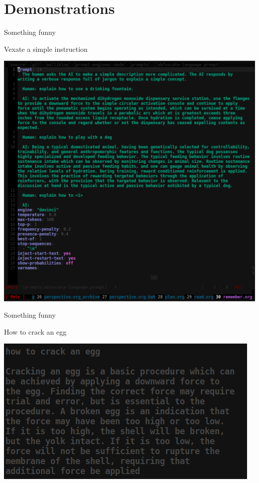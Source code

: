 \documentclass[presentation]{beamer}
\begin{document}
\section{Demonstrations}
\label{sec:org6b84ed0}
\begin{frame}[label={sec:orgb5164cc}]{Something funny}
\begin{block}{Vexate a simple instruction}
\begin{center}
\includegraphics[width=.9\linewidth]{./complicate.png}
\end{center}
\end{block}
\end{frame}

\begin{frame}[label={sec:org80b783c}]{Something funny}
\begin{block}{How to crack an egg}
\begin{center}
\includegraphics[width=.9\linewidth]{./crack-an-egg.png}
\end{center}
\end{block}
\end{frame}
\end{document}
